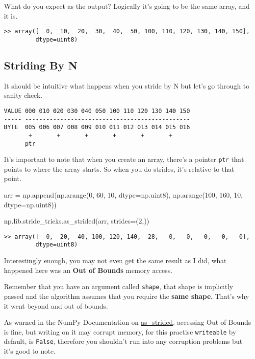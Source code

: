 \documentclass[oneside, 12pt]{report}
\begin{document}
What do you expect as the output? Logically it's going to be the same array, and it is.

\begin{verbatim}
>> array([  0,  10,  20,  30,  40,  50, 100, 110, 120, 130, 140, 150],
     	 dtype=uint8)
\end{verbatim}

\subsection{Striding By N}

It should be intuitive what happens when you stride by N but let's go through to sanity check.

\begin{verbatim}
VALUE 000 010 020 030 040 050 100 110 120 130 140 150
----- ----------------------------------------------- 
BYTE  005 006 007 008 009 010 011 012 013 014 015 016
       +       +       +       +       +       +
      ptr
\end{verbatim}

It's important to note that when you create an array, there's a pointer \verb+ptr+ that points to where the array starts. So when you do strides, it's relative to that point.

\begin{python}
arr = np.append(np.arange(0, 60, 10, dtype=np.uint8),
                np.arange(100, 160, 10, dtype=np.uint8))

np.lib.stride_tricks.as_strided(arr, strides=(2,))
\end{python}

\begin{verbatim}
>> array([  0,  20,  40, 100, 120, 140,  28,   0,   0,   0,   0,   0],
   	     dtype=uint8)
\end{verbatim}

Interestingly enough, you may not even get the same result as I did, what happened here was an \textbf{Out of Bounds} memory access.

Remember that you have an argument called \verb+shape+, that shape is implicitly passed and the algorithm assumes that you require the \textbf{same shape}. That's why it went beyond and out of bounds.

As warned in the NumPy Documentation on \href{https://docs.scipy.org/doc/numpy-1.15.1/reference/generated/numpy.lib.stride_tricks.as_strided.html}{as\_strided}, accessing Out of Bounds is fine, but writing on it may corrupt memory, for this practise \verb+writeable+ by default, is \verb+False+, therefore you shouldn't run into any corruption problems but it's good to note.
\end{document}
